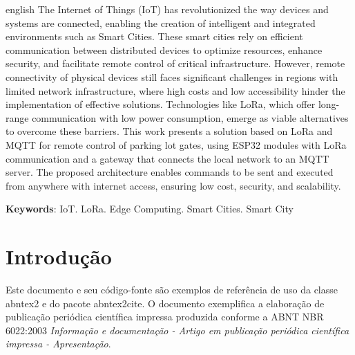 \documentclass[
article,			%
11pt,				%
twoside,			%
a4paper,			%
section=TITLE,		%
onecolumn,          %
english,			%
brazil,				%
sumario=tradicional
]{abntex2}
\begin{document}
    \renewcommand{\resumoname}{Abstract}
    \begin{resumo}
        \begin{otherlanguage*}{english}
            The Internet of Things (IoT) has revolutionized the way devices and systems are connected, enabling the creation of intelligent and integrated environments such as Smart Cities. These smart cities rely on efficient communication between distributed devices to optimize resources, enhance security, and facilitate remote control of critical infrastructure. However, remote connectivity of physical devices still faces significant challenges in regions with limited network infrastructure, where high costs and low accessibility hinder the implementation of effective solutions. Technologies like LoRa, which offer long-range communication with low power consumption, emerge as viable alternatives to overcome these barriers. This work presents a solution based on LoRa and MQTT for remote control of parking lot gates, using ESP32 modules with LoRa communication and a gateway that connects the local network to an MQTT server. The proposed architecture enables commands to be sent and executed from anywhere with internet access, ensuring low cost, security, and scalability.
            
            \noindent
            \textbf{Keywords}: IoT. LoRa. Edge Computing. Smart Cities. Smart City
        \end{otherlanguage*}  
    \end{resumo}
    
    
    \vspace{\onelineskip}%
    
    
    
    \textual
    
    \section{Introdução}
    
    Este documento e seu código-fonte são exemplos de referência de uso da classe \textsf{abntex2} e do pacote \textsf{abntex2cite}. O documento exemplifica a elaboração de publicação periódica científica impressa produzida conforme a ABNT NBR 6022:2003 \emph{Informação e documentação - Artigo em publicação periódica científica impressa - Apresentação}.
    
\end{document}
